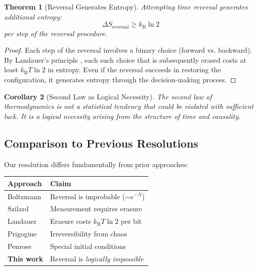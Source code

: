 \documentclass[twocolumn,10pt,a4paper]{article}
\newtheorem{theorem}{Theorem}[section]
\newtheorem{corollary}[theorem]{Corollary}
\theoremstyle{definition}
\theoremstyle{remark}
\newcommand{\kB}{k_{\mathrm{B}}}
\begin{document}
\begin{theorem}[Reversal Generates Entropy]
\label{thm:reversal_entropy}
Attempting time reversal generates additional entropy:
\begin{equation}
    \Delta S_{\text{reversal}} \geq \kB \ln 2
\end{equation}
per step of the reversal procedure.
\end{theorem}

\begin{proof}
Each step of the reversal involves a binary choice (forward vs. backward). By Landauer's principle \cite{landauer1961}, each such choice that is subsequently erased costs at least $\kB T \ln 2$ in entropy. Even if the reversal succeeds in restoring the configuration, it generates entropy through the decision-making process.
\end{proof}

\begin{corollary}[Second Law as Logical Necessity]
The second law of thermodynamics is not a statistical tendency that could be violated with sufficient luck. It is a logical necessity arising from the structure of time and causality.
\end{corollary}

\subsection{Comparison to Previous Resolutions}

Our resolution differs fundamentally from prior approaches:

\begin{center}
\begin{tabular}{p{3cm}p{4cm}}
\toprule
\textbf{Approach} & \textbf{Claim} \\
\midrule
Boltzmann \cite{boltzmann1877} & Reversal is improbable ($\sim e^{-N}$) \\
Szilard \cite{szilard1929} & Measurement requires erasure \\
Landauer \cite{landauer1961} & Erasure costs $\kB T \ln 2$ per bit \\
Prigogine \cite{prigogine1977} & Irreversibility from chaos \\
Penrose \cite{penrose1989} & Special initial conditions \\
\textbf{This work} & Reversal is \emph{logically impossible} \\
\bottomrule
\end{tabular}
\end{center}
\end{document}
